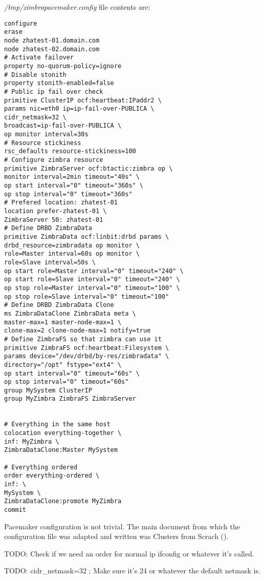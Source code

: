 \textit{/tmp/zimbrapacemaker.config} file contents are:
\begin{verbatim}
configure
erase
node zhatest-01.domain.com
node zhatest-02.domain.com
# Activate failover
property no-quorum-policy=ignore
# Disable stonith
property stonith-enabled=false
# Public ip fail over check
primitive ClusterIP ocf:heartbeat:IPaddr2 \
params nic=eth0 ip=ip-fail-over-PUBLICA \
cidr_netmask=32 \
broadcast=ip-fail-over-PUBLICA \
op monitor interval=30s
# Resource stickiness
rsc_defaults resource-stickiness=100
# Configure zimbra resource
primitive ZimbraServer ocf:btactic:zimbra op \
monitor interval=2min timeout="40s" \
op start interval="0" timeout="360s" \
op stop interval="0" timeout="360s"
# Prefered location: zhatest-01
location prefer-zhatest-01 \
ZimbraServer 50: zhatest-01
# Define DRBD ZimbraData
primitive ZimbraData ocf:linbit:drbd params \
drbd_resource=zimbradata op monitor \
role=Master interval=60s op monitor \
role=Slave interval=50s \
op start role=Master interval="0" timeout="240" \
op start role=Slave interval="0" timeout="240" \
op stop role=Master interval="0" timeout="100" \
op stop role=Slave interval="0" timeout="100"
# Define DRBD ZimbraData Clone
ms ZimbraDataClone ZimbraData meta \
master-max=1 master-node-max=1 \
clone-max=2 clone-node-max=1 notify=true
# Define ZimbraFS so that zimbra can use it
primitive ZimbraFS ocf:heartbeat:Filesystem \
params device="/dev/drbd/by-res/zimbradata" \
directory="/opt" fstype="ext4" \
op start interval="0" timeout="60s" \
op stop interval="0" timeout="60s"
group MySystem ClusterIP
group MyZimbra ZimbraFS ZimbraServer


# Everything in the same host
colocation everything-together \
inf: MyZimbra \
ZimbraDataClone:Master MySystem

# Everything ordered
order everything-ordered \
inf: \
MySystem \
ZimbraDataClone:promote MyZimbra
commit
\end{verbatim}

Pacemaker configuration is not trivial. The main document from which the configuration file was adapted and written was Clusters from Scrach (\cite{ClustersFromScratch}).

TODO: Check if we need an order for normal ip ifconfig or whatever it's called.

TODO: cidr\_netmask=32 ; Make sure it's 24 or whatever the default netmask is.

